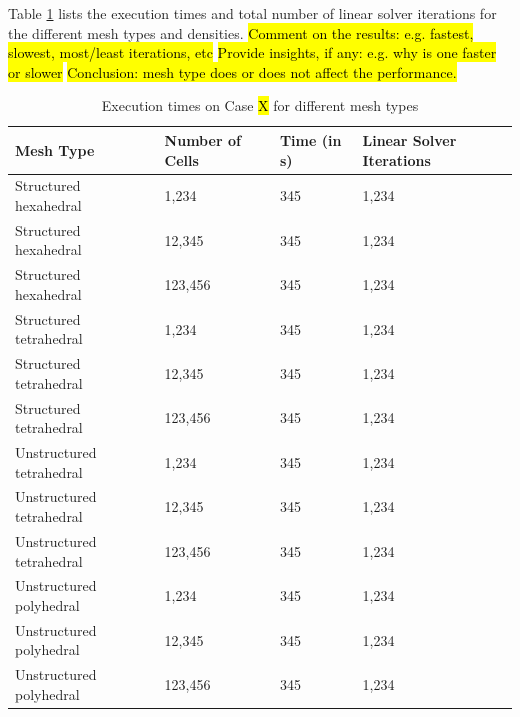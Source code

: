 \documentclass[sn-mathphys,Numbered]{sn-jnl}%
\begin{document}
Table \ref{tab:mesh_types} lists the execution times and total number of linear solver iterations for the different mesh types and densities.
\hl{Comment on the results: e.g. fastest, slowest, most/least iterations, etc}
\hl{Provide insights, if any: e.g. why is one faster or slower}
\hl{Conclusion: mesh type does or does not affect the performance.}
\begin{table}[htb]
	\centering
		\begin{tabular}{llll}
			\hline
			Mesh Type & Number of Cells & Time (in s) & Linear Solver Iterations  \\
			\hline 
			Structured hexahedral & 1,234 & 345 & 1,234  \\
			Structured hexahedral & 12,345 & 345 & 1,234  \\
			Structured hexahedral & 123,456 & 345 & 1,234  \\
			Structured tetrahedral & 1,234 & 345 & 1,234  \\
			Structured tetrahedral & 12,345 & 345 & 1,234  \\
			Structured tetrahedral & 123,456 & 345 & 1,234  \\
			Unstructured tetrahedral & 1,234 & 345 & 1,234  \\
			Unstructured tetrahedral & 12,345 & 345 & 1,234  \\
			Unstructured tetrahedral & 123,456 & 345 & 1,234  \\
			Unstructured polyhedral & 1,234 & 345 & 1,234  \\
			Unstructured polyhedral & 12,345 & 345 & 1,234  \\
			Unstructured polyhedral & 123,456 & 345 & 1,234  \\
			\hline
		\end{tabular}
	\caption{Execution times on Case \hl{X} for different mesh types}
	\label{tab:mesh_types}
\end{table}


\end{document}
